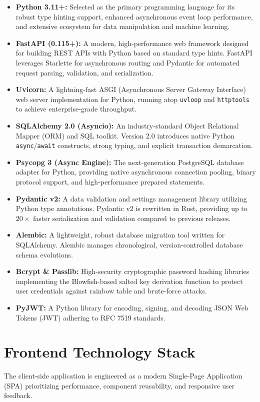 \documentclass[11pt,a4paper,oneside]{report}
\begin{document}
\begin{itemize}
    \item \textbf{Python 3.11+:} Selected as the primary programming language for its robust type hinting support, enhanced asynchronous event loop performance, and extensive ecosystem for data manipulation and machine learning.
    \item \textbf{FastAPI (0.115+):} A modern, high-performance web framework designed for building REST APIs with Python based on standard type hints. FastAPI leverages Starlette for asynchronous routing and Pydantic for automated request parsing, validation, and serialization.
    \item \textbf{Uvicorn:} A lightning-fast ASGI (Asynchronous Server Gateway Interface) web server implementation for Python, running atop \texttt{uvloop} and \texttt{httptools} to achieve enterprise-grade throughput.
    \item \textbf{SQLAlchemy 2.0 (Asyncio):} An industry-standard Object Relational Mapper (ORM) and SQL toolkit. Version 2.0 introduces native Python \texttt{async}/\texttt{await} constructs, strong typing, and explicit transaction demarcation.
    \item \textbf{Psycopg 3 (Async Engine):} The next-generation PostgreSQL database adapter for Python, providing native asynchronous connection pooling, binary protocol support, and high-performance prepared statements.
    \item \textbf{Pydantic v2:} A data validation and settings management library utilizing Python type annotations. Pydantic v2 is rewritten in Rust, providing up to $20\times$ faster serialization and validation compared to previous releases.
    \item \textbf{Alembic:} A lightweight, robust database migration tool written for SQLAlchemy. Alembic manages chronological, version-controlled database schema evolutions.
    \item \textbf{Bcrypt \& Passlib:} High-security cryptographic password hashing libraries implementing the Blowfish-based salted key derivation function to protect user credentials against rainbow table and brute-force attacks.
    \item \textbf{PyJWT:} A Python library for encoding, signing, and decoding JSON Web Tokens (JWT) adhering to RFC 7519 standards.
\end{itemize}

\section{Frontend Technology Stack}
\label{sec:tech_frontend}
The client-side application is engineered as a modern Single-Page Application (SPA) prioritizing performance, component reusability, and responsive user feedback.
\end{document}
